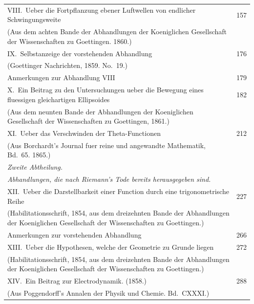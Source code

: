 \documentclass[11pt,a4paper]{article}
\theoremstyle{plain}
\theoremstyle{definition}
\begin{document}
\begin{longtable}{p{12cm}r}
VIII.\ Ueber die Fortpflanzung ebener Luftwellen von endlicher Schwingungsweite & 157\\
\quad (Aus dem achten Bande der Abhandlungen der Koeniglichen Gesellschaft der Wissenschaften zu Goettingen. 1860.)\\[0.5em]

IX.\ Selbstanzeige der vorstehenden Abhandlung & 176\\
\quad (Goettinger Nachrichten, 1859. No.\ 19.)\\
\quad Anmerkungen zur Abhandlung VIII & 179\\[0.5em]

X.\ Ein Beitrag zu den Untersuchungen ueber die Bewegung eines fluessigen gleichartigen Ellipsoides & 182\\
\quad (Aus dem neunten Bande der Abhandlungen der Koeniglichen Gesellschaft der Wissenschaften zu Goettingen, 1861.)\\[0.5em]

XI.\ Ueber das Verschwinden der Theta-Functionen & 212\\
\quad (Aus Borchardt's Journal fuer reine und angewandte Mathematik, Bd.\ 65. 1865.)\\[0.5em]

\multicolumn{2}{l}{\textit{Zweite Abtheilung.}}\\
\multicolumn{2}{l}{\textit{Abhandlungen, die nach Riemann's Tode bereits herausgegeben sind.}}\\[0.5em]

XII.\ Ueber die Darstellbarkeit einer Function durch eine trigonometrische Reihe & 227\\
\quad (Habilitationsschrift, 1854, aus dem dreizehnten Bande der Abhandlungen der Koeniglichen Gesellschaft der Wissenschaften zu Goettingen.)\\
\quad Anmerkungen zur vorstehenden Abhandlung & 266\\[0.5em]

XIII.\ Ueber die Hypothesen, welche der Geometrie zu Grunde liegen & 272\\
\quad (Habilitationsschrift, 1854, aus dem dreizehnten Bande der Abhandlungen der Koeniglichen Gesellschaft der Wissenschaften zu Goettingen.)\\[0.5em]

XIV.\ Ein Beitrag zur Electrodynamik. (1858.) & 288\\
\quad (Aus Poggendorff's Annalen der Physik und Chemie. Bd.\ CXXXI.)\\[0.5em]


\end{longtable}
\end{document}
